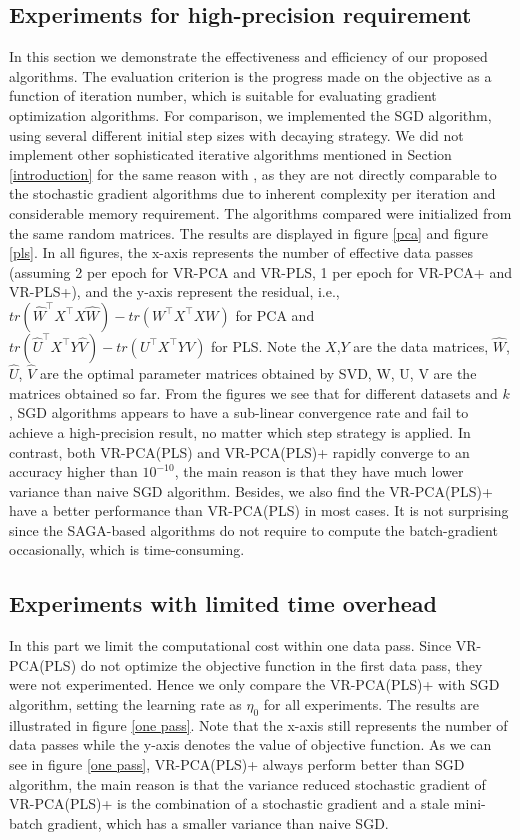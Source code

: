 \documentclass[conference]{IEEEtran}
\begin{document}
 
 
 
 \subsection{Experiments for high-precision requirement}
 In this section we demonstrate the effectiveness and efficiency of our proposed algorithms. The evaluation criterion is the progress made on the objective as a function of iteration number, which is suitable for evaluating gradient optimization algorithms. 
 For comparison, we implemented the SGD algorithm, using several different initial step sizes with decaying strategy. We did not implement other sophisticated iterative algorithms mentioned in Section \ref{introduction} for the same reason with \citep{Shamir2015A}, as they are not directly comparable to the stochastic gradient algorithms due to inherent complexity per iteration and considerable memory requirement.
  The algorithms compared were initialized from the same random matrices. The results are displayed in figure \ref{pca} and figure \ref{pls}.
  In all figures, the x-axis represents the number of effective data passes (assuming 2 per epoch for VR-PCA and VR-PLS, 1 per epoch for VR-PCA+ and VR-PLS+), and the y-axis represent the residual, i.e., $tr(\hat{W}^{\top}X^{\top}X\hat{W}) - tr(W^{\top}X^{\top}XW)$ for PCA and $tr(\hat{U}^{\top}X^{\top}Y\hat{V}) - tr(U^{\top}X^{\top}YV)$ for PLS. Note the $X$,$Y$ are the data matrices, $\hat{W}$, $\hat{U}$, $\hat{V}$ are the optimal parameter matrices obtained by SVD, W, U, V are the matrices obtained so far. 
 From the figures we see that for different datasets and $k$, SGD algorithms appears to have a sub-linear convergence rate and fail to achieve a high-precision result, no matter which step strategy is applied.
In contrast, both VR-PCA(PLS) and VR-PCA(PLS)+ rapidly converge to an accuracy higher than $10^{-10}$, the main reason is that they have much lower variance than naive SGD algorithm. Besides, we also find the VR-PCA(PLS)+ have a better performance than VR-PCA(PLS) in most cases. It is not surprising since the SAGA-based algorithms do not require to compute the batch-gradient occasionally, which is time-consuming.
 
 \subsection{Experiments with limited time overhead}
 In this part we limit the computational cost within one data pass. Since VR-PCA(PLS) do not optimize the objective function in the first data pass, they were not experimented. Hence we only compare the VR-PCA(PLS)+ with SGD algorithm, setting the learning rate as $\eta_0$ for all experiments.
 The results are illustrated in figure \ref{one pass}.  Note that the x-axis still represents the number of data passes while the y-axis denotes the value of objective function. As we can see in figure \ref{one pass}, VR-PCA(PLS)+ always perform better than SGD algorithm, the main reason is that the variance reduced stochastic gradient of VR-PCA(PLS)+ is the combination of a stochastic gradient and a stale mini-batch gradient, which has a smaller variance than naive SGD.
 
\end{document}
